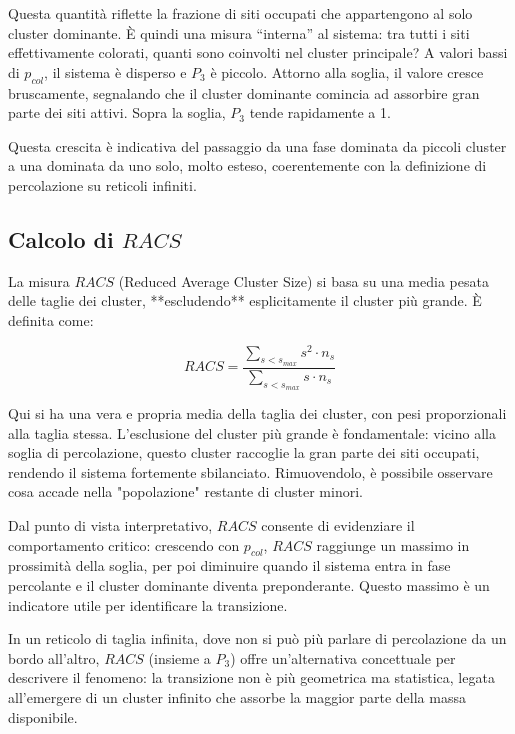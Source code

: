 Questa quantità riflette la frazione di siti occupati che appartengono al solo cluster dominante. È quindi una misura “interna” al sistema: tra tutti i siti effettivamente colorati, quanti sono coinvolti nel cluster principale? A valori bassi di $p_{col}$, il sistema è disperso e $P_3$ è piccolo. Attorno alla soglia, il valore cresce bruscamente, segnalando che il cluster dominante comincia ad assorbire gran parte dei siti attivi. Sopra la soglia, $P_3$ tende rapidamente a 1.

Questa crescita è indicativa del passaggio da una fase dominata da piccoli cluster a una dominata da uno solo, molto esteso, coerentemente con la definizione di percolazione su reticoli infiniti.

\subsection{Calcolo di $RACS$}

La misura $RACS$ (Reduced Average Cluster Size) si basa su una media pesata delle taglie dei cluster, **escludendo** esplicitamente il cluster più grande. È definita come:

\begin{equation}
	RACS = \frac{\sum\limits_{s < s_{max}} s^2 \cdot n_s}{\sum\limits_{s < s_{max}} s \cdot n_s}
\end{equation}

Qui si ha una vera e propria media della taglia dei cluster, con pesi proporzionali alla taglia stessa. L'esclusione del cluster più grande è fondamentale: vicino alla soglia di percolazione, questo cluster raccoglie la gran parte dei siti occupati, rendendo il sistema fortemente sbilanciato. Rimuovendolo, è possibile osservare cosa accade nella "popolazione" restante di cluster minori.

Dal punto di vista interpretativo, $RACS$ consente di evidenziare il comportamento critico: crescendo con $p_{col}$, $RACS$ raggiunge un massimo in prossimità della soglia, per poi diminuire quando il sistema entra in fase percolante e il cluster dominante diventa preponderante. Questo massimo è un indicatore utile per identificare la transizione.

In un reticolo di taglia infinita, dove non si può più parlare di percolazione da un bordo all'altro, $RACS$ (insieme a $P_3$) offre un’alternativa concettuale per descrivere il fenomeno: la transizione non è più geometrica ma statistica, legata all'emergere di un cluster infinito che assorbe la maggior parte della massa disponibile.
